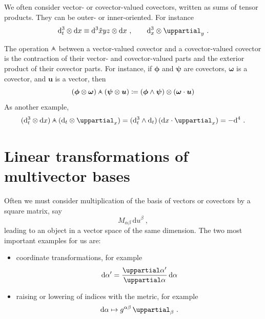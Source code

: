 \documentclass[\ifafour a4paper,12pt,\else a5paper,10pt,\fi%
onecolumn,oneside,article,%
british%
]{memoir}
\theoremstyle{remark}
\theoremstyle{innote}
\newcommand*{\de}{\uppartial}%
\newcommand*{\di}{\mathrm{d}}%
\newcommand*{\defd}{\coloneqq}
\renewcommand*{\|}[1][]{\nonscript\:#1\vert\nonscript\:\mathopen{}}
\newcommand*{\dand}{\mathbin{\mathclap{\mkern12.5mu\bm{\cdot}}\wedge}}
\newcommand*{\se}[1]{\de_{#1}}
\newcommand*{\si}[1]{\di{#1}}
\newcommand*{\sssi}[1]{\di^{3}{#1}}
\newcommand*{\tw}[1]{\tilde{#1}}
\newcommand*{\ti}[1]{\di_{#1}}
\newcommand*{\ttti}[1]{\di^{3}_{#1}}
\newcommand*{\tttti}[1]{\di^{4}_{#1}}
\newcommand*{\yu}{\bm{u}}
\newcommand*{\yo}{\bm{\omega}}
\newcommand*{\yphi}{\bm{\phi}}
\newcommand*{\ypsi}{\bm{\psi}}
\begin{document}
\medskip

We often consider vector- or covector-valued covectors, written as sums of tensor products. They can be outer- or inner-oriented. For instance
\begin{equation}
  \label{eq:cov-valued_cov}
  \ttti{t} \otimes \si{x} \equiv \sssi{\tw{x}yz} \otimes \si{x} \ ,
  \qquad
  \ttti{x} \otimes \se{y} \ .
\end{equation}

The operation $\dand$ between a vector-valued covector and a covector-valued covector is the contraction of their vector- and covector-valued parts and the exterior product of their covector parts. For instance, if $\yphi$ and $\ypsi$ are covectors, $\yo$ is a covector, and $\yu$ is a vector, then
\begin{equation}
  \label{eq:dot_cov_valued}
  (\yphi \otimes \yo) \dand (\ypsi \otimes \yu) \defd
  (\yphi \land \ypsi) \otimes (\yo \cdot \yu)
\end{equation}
As another example,
\begin{equation}
  \label{eq:ex_dand}
  (\ttti{t} \otimes \si{x}) \dand (\ti{t} \otimes \se{x}) = (\ttti{t} \land \ti{t})\, (\si{x} \cdot \se{x}) = -\tttti{} \ .
\end{equation}



\section{Linear transformations of multivector bases}
\label{sec:lintransf_multiv}

Often we must consider multiplication of the basis of vectors or covectors by a square matrix, say
\begin{equation*}
  \label{eq:matrix_mult_bases}
  M_{\alpha\beta}\,\di u^{\beta} \ ,
\end{equation*}
leading to an object in a vector space of the same dimension. The two most important examples for us are:
\begin{itemize}
\item coordinate transformations, for example
  \begin{equation*}
   \di \alpha'= \frac{\de \alpha'}{\de \alpha}\,\di \alpha
  \end{equation*}
\item raising or lowering of indices with the metric, for example
  \begin{equation*}
  \di \alpha \mapsto  g^{\alpha\beta}\, \de_{\beta} \ .
  \end{equation*}
\end{itemize}
\end{document}
